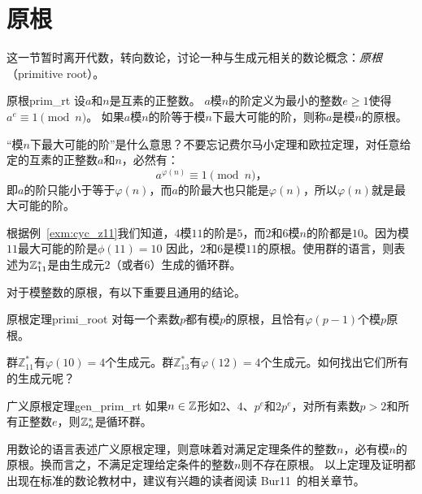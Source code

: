 \section{原根}
这一节暂时离开代数，转向数论，讨论一种与生成元相关的数论概念：\emph{原根}（primitive root）。

\begin{definition}{原根}{prim_rt}
设$a$和$n$是互素的正整数。 $a$模$n$的阶定义为最小的整数$e \geq 1$使得$a^e \equiv 1 \pmod{n}$。
如果$a$模$n$的阶等于模$n$下最大可能的阶，则称$a$是模$n$的原根。
\end{definition}
“模$n$下最大可能的阶”是什么意思？不要忘记费尔马小定理和欧拉定理，对任意给定的互素的正整数$a$和$n$，必然有：
\[a^{\varphi(n)} \equiv  1 \pmod{n}\text{，}\]
即$a$的阶只能小于等于$\varphi(n)$，而$a$的阶最大也只能是$\varphi(n)$，所以$\varphi(n)$就是最大可能的阶。
\begin{example}
\label{exm:cyc_prim}
根据例~\ref{exm:cyc_z11}我们知道，$4$模$11$的阶是$5$，而$2$和$6$模$n$的阶都是$10$。因为模$11$最大可能的阶是$\phi(11)=10$
因此，$2$和$6$是模$11$的原根。使用群的语言，则表述为${\mathbb Z}_{11}^*$是由生成元$2$（或者$6$）生成的循环群。
\end{example}

对于模整数的原根，有以下重要且通用的结论。
\begin{theorem}{原根定理}{primi_root}
对每一个素数$p$都有模$p$的原根，且恰有$\varphi(p-1)$个模$p$原根。
\end{theorem}

\begin{example}
群$\mathbb{Z}_{11}^*$有$\varphi(10) = 4$个生成元。群$\mathbb{Z}_{13}^*$有$\varphi(12) = 4$个生成元。如何找出它们所有的生成元呢？
\end{example}

\begin{theorem}{广义原根定理}{gen_prim_rt}
如果$n \in {\mathbb Z}$形如$2$、$4$、$p^e$和$2p^e$，对所有素数$p > 2$和所有正整数$e$，则${\mathbb Z}_n^*$是循环群。
\end{theorem}
用数论的语言表述广义原根定理，则意味着对满足定理条件的整数$n$，必有模$n$的原根。换而言之，不满足定理给定条件的整数$n$则不存在原根。
以上定理及证明都出现在标准的数论教材中，建议有兴趣的读者阅读 Bur11~\cite{Bur11}的相关章节。

